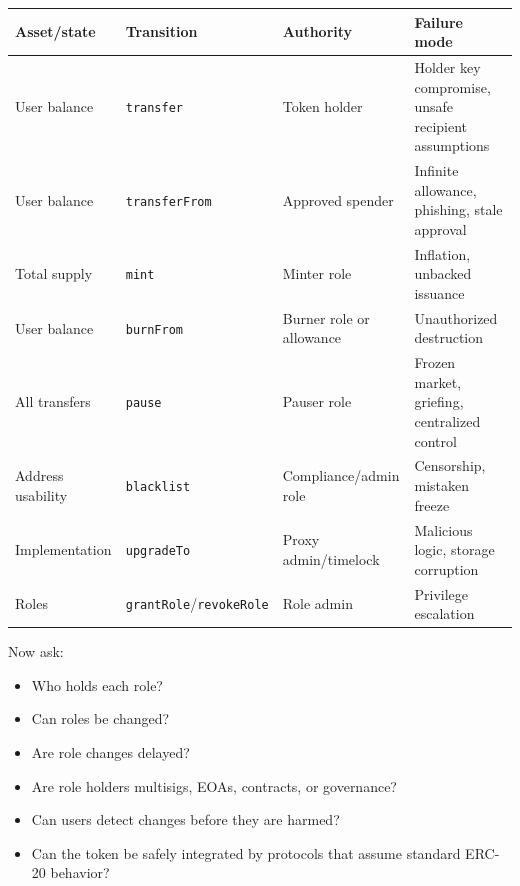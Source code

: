 {\def\LTcaptype{none} %
\begin{longtable}[]{@{}
  >{\raggedright\arraybackslash}p{}
  >{\raggedright\arraybackslash}p{}
  >{\raggedright\arraybackslash}p{}
  >{\raggedright\arraybackslash}p{}@{}}
\toprule\noalign{}
\begin{minipage}[b]{\linewidth}\raggedright
Asset/state
\end{minipage} & \begin{minipage}[b]{\linewidth}\raggedright
Transition
\end{minipage} & \begin{minipage}[b]{\linewidth}\raggedright
Authority
\end{minipage} & \begin{minipage}[b]{\linewidth}\raggedright
Failure mode
\end{minipage} \\
\midrule\noalign{}
\endhead
\bottomrule\noalign{}
\endlastfoot
User balance & \passthrough{\lstinline!transfer!} & Token holder &
Holder key compromise, unsafe recipient assumptions \\
User balance & \passthrough{\lstinline!transferFrom!} & Approved spender
& Infinite allowance, phishing, stale approval \\
Total supply & \passthrough{\lstinline!mint!} & Minter role & Inflation,
unbacked issuance \\
User balance & \passthrough{\lstinline!burnFrom!} & Burner role or
allowance & Unauthorized destruction \\
All transfers & \passthrough{\lstinline!pause!} & Pauser role & Frozen
market, griefing, centralized control \\
Address usability & \passthrough{\lstinline!blacklist!} &
Compliance/admin role & Censorship, mistaken freeze \\
Implementation & \passthrough{\lstinline!upgradeTo!} & Proxy
admin/timelock & Malicious logic, storage corruption \\
Roles &
\passthrough{\lstinline!grantRole!}/\passthrough{\lstinline!revokeRole!}
& Role admin & Privilege escalation \\
\end{longtable}
}

Now ask:

\begin{itemize}
\tightlist
\item
  Who holds each role?
\item
  Can roles be changed?
\item
  Are role changes delayed?
\item
  Are role holders multisigs, EOAs, contracts, or governance?
\item
  Can users detect changes before they are harmed?
\item
  Can the token be safely integrated by protocols that assume standard
  ERC-20 behavior?
\end{itemize}

